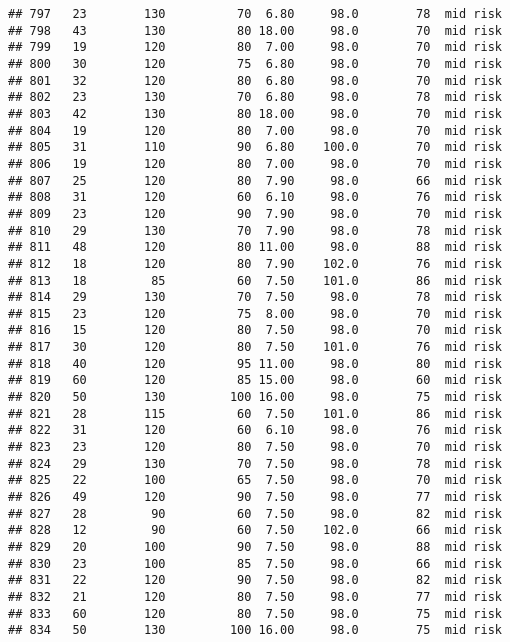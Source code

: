 \documentclass[
  ignorenonframetext,
]{beamer}
\begin{document}
\begin{frame}[fragile]
\begin{verbatim}
## 797   23        130          70  6.80     98.0        78  mid risk
## 798   43        130          80 18.00     98.0        70  mid risk
## 799   19        120          80  7.00     98.0        70  mid risk
## 800   30        120          75  6.80     98.0        70  mid risk
## 801   32        120          80  6.80     98.0        70  mid risk
## 802   23        130          70  6.80     98.0        78  mid risk
## 803   42        130          80 18.00     98.0        70  mid risk
## 804   19        120          80  7.00     98.0        70  mid risk
## 805   31        110          90  6.80    100.0        70  mid risk
## 806   19        120          80  7.00     98.0        70  mid risk
## 807   25        120          80  7.90     98.0        66  mid risk
## 808   31        120          60  6.10     98.0        76  mid risk
## 809   23        120          90  7.90     98.0        70  mid risk
## 810   29        130          70  7.90     98.0        78  mid risk
## 811   48        120          80 11.00     98.0        88  mid risk
## 812   18        120          80  7.90    102.0        76  mid risk
## 813   18         85          60  7.50    101.0        86  mid risk
## 814   29        130          70  7.50     98.0        78  mid risk
## 815   23        120          75  8.00     98.0        70  mid risk
## 816   15        120          80  7.50     98.0        70  mid risk
## 817   30        120          80  7.50    101.0        76  mid risk
## 818   40        120          95 11.00     98.0        80  mid risk
## 819   60        120          85 15.00     98.0        60  mid risk
## 820   50        130         100 16.00     98.0        75  mid risk
## 821   28        115          60  7.50    101.0        86  mid risk
## 822   31        120          60  6.10     98.0        76  mid risk
## 823   23        120          80  7.50     98.0        70  mid risk
## 824   29        130          70  7.50     98.0        78  mid risk
## 825   22        100          65  7.50     98.0        70  mid risk
## 826   49        120          90  7.50     98.0        77  mid risk
## 827   28         90          60  7.50     98.0        82  mid risk
## 828   12         90          60  7.50    102.0        66  mid risk
## 829   20        100          90  7.50     98.0        88  mid risk
## 830   23        100          85  7.50     98.0        66  mid risk
## 831   22        120          90  7.50     98.0        82  mid risk
## 832   21        120          80  7.50     98.0        77  mid risk
## 833   60        120          80  7.50     98.0        75  mid risk
## 834   50        130         100 16.00     98.0        75  mid risk

\end{verbatim}
\end{frame}
\end{document}
